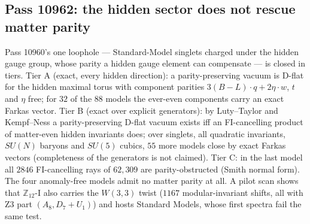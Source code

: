 \subsection{Pass 10962: the hidden sector does not rescue matter parity}

Pass 10960's one loophole --- Standard-Model singlets charged under the hidden gauge group,
whose parity a hidden gauge element can compensate --- is closed in tiers.  Tier A (exact,
every hidden direction): a parity-preserving vacuum is D-flat for the hidden maximal torus
with component parities $3(B-L)\cdot q+2\eta\cdot w$, $t$ and $\eta$ free; for $32$ of the $88$
models the ever-even components carry an exact Farkas vector.  Tier B (exact over explicit
generators): by Luty--Taylor and Kempf--Ness a parity-preserving D-flat vacuum exists iff an
FI-cancelling product of matter-even hidden invariants does; over singlets, all quadratic
invariants, $SU(N)$ baryons and $SU(5)$ cubics, $55$ more models close by exact Farkas vectors
(completeness of the generators is not claimed).  Tier C: in the last model all $2846$
FI-cancelling rays of $62{,}309$ are parity-obstructed (Smith normal form).  The four
anomaly-free models admit no matter parity at all.  A pilot scan shows that $\mathbb{Z}_{12}$-I
also carries the $W(3,3)$ twist ($1167$ modular-invariant shifts, all with Z3 part
$(A_8,D_7{+}U_1)$) and hosts Standard Models, whose first spectra fail the same test.
